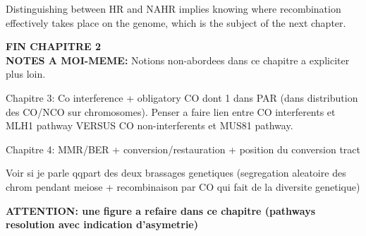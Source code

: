Distinguishing between HR and NAHR implies knowing where recombination effectively takes place on the genome, which is the subject of the next chapter.

\textbf{FIN CHAPITRE 2}\\



\textbf{NOTES A MOI-MEME\@:} Notions non-abordees dans ce chapitre a expliciter plus loin.

Chapitre 3: Co interference + obligatory CO dont 1 dans PAR (dans distribution des CO/NCO sur chromosomes). Penser a faire lien entre CO interferents et MLH1 pathway VERSUS CO non-interferents et MUS81 pathway.

Chapitre 4: MMR/BER + conversion/restauration + position du conversion tract

Voir si je parle qqpart des deux brassages genetiques (segregation aleatoire des chrom pendant meiose + recombinaison par CO qui fait de la diversite genetique)


\textbf{ATTENTION\@: une figure a refaire dans ce chapitre (pathways resolution avec indication d'asymetrie)}





